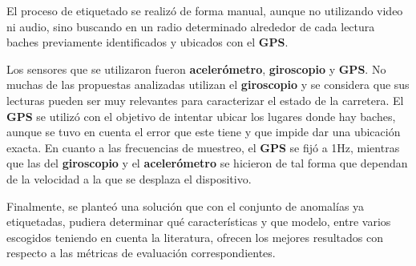 	El proceso de etiquetado se realizó de forma manual, aunque no utilizando video ni audio, sino buscando en un radio determinado alrededor de cada
	lectura baches previamente identificados y ubicados con el \textbf{GPS}.

	Los sensores que se utilizaron fueron \textbf{acelerómetro}, \textbf {giroscopio} y \textbf{GPS}. No muchas de las propuestas analizadas utilizan
	el \textbf{giroscopio} y se considera que sus lecturas pueden ser muy relevantes para caracterizar el estado de la carretera. El \textbf{GPS}
	se utilizó con el objetivo de intentar ubicar los lugares donde hay baches, aunque se tuvo en cuenta el error que este tiene y que impide dar
	una ubicación exacta. En cuanto a las frecuencias de muestreo, el \textbf{GPS} se fijó a 1Hz, mientras que las del \textbf{giroscopio} y el
	\textbf{acelerómetro} se hicieron de tal forma que dependan de la velocidad a la que se desplaza el dispositivo.

	Finalmente, se planteó una solución que con el conjunto de anomalías ya etiquetadas, pudiera determinar qué características y que modelo, entre
	varios escogidos teniendo en cuenta la literatura, ofrecen los mejores resultados con respecto a las métricas de evaluación correspondientes.
	

